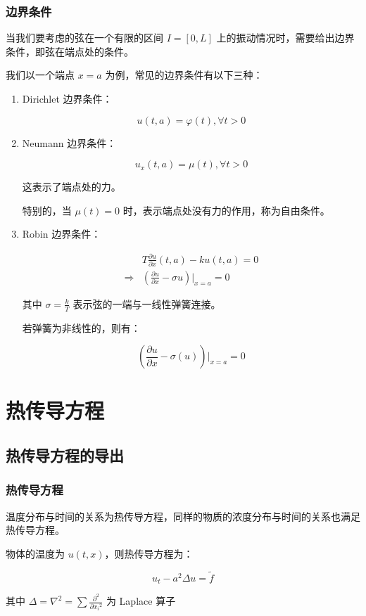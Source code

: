 \documentclass{beamer}
\begin{document}
\begin{frame}[allowframebreaks]
	\frametitle{边界条件}
	当我们要考虑的弦在一个有限的区间 $I=[0,L]$ 上的振动情况时，需要给出边界条件，即弦在端点处的条件。\newline

	我们以一个端点 $x=a$ 为例，常见的边界条件有以下三种：

	\begin{enumerate}
		\item Dirichlet 边界条件：

		      $$
			      u(t,a)=\varphi(t),\forall t> 0
		      $$
		\item Neumann 边界条件：

		      $$
			      u_x(t,a)=\mu(t),\forall t> 0
		      $$

		      这表示了端点处的力。\newline

		      特别的，当 $\mu(t)= 0$ 时，表示端点处没有力的作用，称为自由条件。

		\item Robin 边界条件：

		      $$
			      \begin{aligned}
				                  & T\frac{\partial u}{\partial x}(t,a)-ku(t,a)=0                \\
				      \Rightarrow & \left(\frac{\partial u}{\partial x}-\sigma u\right)|_{x=a}=0
			      \end{aligned}
		      $$

		      其中 $\sigma = \frac{k}{T}$ 表示弦的一端与一线性弹簧连接。\newline

		      若弹簧为非线性的，则有：

		      $$
			      \left(\frac{\partial u}{\partial x}-\sigma (u)\right)|_{x=a}=0
		      $$
	\end{enumerate}
\end{frame}


\section{热传导方程}

\subsection{热传导方程的导出}

\begin{frame}[allowframebreaks]
	\frametitle{热传导方程}
	温度分布与时间的关系为热传导方程，同样的物质的浓度分布与时间的关系也满足热传导方程。

	物体的温度为 $u(t,x)$，则热传导方程为：

	\begin{equation}
		u_t-a^2\Delta u=\tilde{f}
		\label{eq:heat}
	\end{equation}

	其中 $\Delta=\nabla^2=\sum\frac{\partial^2}{\partial {x_i}^2}$ 为 Laplace 算子

\end{frame}
\end{document}
